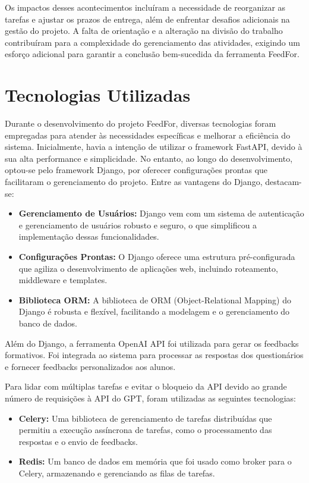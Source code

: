 Os impactos desses acontecimentos incluíram a necessidade de reorganizar as tarefas e ajustar os prazos de entrega, além de enfrentar desafios adicionais na gestão do projeto. A falta de orientação e a alteração na divisão do trabalho contribuíram para a complexidade do gerenciamento das atividades, exigindo um esforço adicional para garantir a conclusão bem-sucedida da ferramenta FeedFor.

\section{Tecnologias Utilizadas}

Durante o desenvolvimento do projeto FeedFor, diversas tecnologias foram empregadas para atender às necessidades específicas e melhorar a eficiência do sistema. Inicialmente, havia a intenção de utilizar o framework FastAPI, devido à sua alta performance e simplicidade. No entanto, ao longo do desenvolvimento, optou-se pelo framework Django, por oferecer configurações prontas que facilitaram o gerenciamento do projeto. Entre as vantagens do Django, destacam-se:

\begin{itemize}
    \item \textbf{Gerenciamento de Usuários:} Django vem com um sistema de autenticação e gerenciamento de usuários robusto e seguro, o que simplificou a implementação dessas funcionalidades.
    \item \textbf{Configurações Prontas:} O Django oferece uma estrutura pré-configurada que agiliza o desenvolvimento de aplicações web, incluindo roteamento, middleware e templates.
    \item \textbf{Biblioteca ORM:} A biblioteca de ORM (Object-Relational Mapping) do Django é robusta e flexível, facilitando a modelagem e o gerenciamento do banco de dados.
\end{itemize}

Além do Django, a ferramenta OpenAI API foi utilizada para gerar os feedbacks formativos. Foi integrada ao sistema para processar as respostas dos questionários e fornecer feedbacks personalizados aos alunos.

Para lidar com múltiplas tarefas e evitar o bloqueio da API devido ao grande número de requisições à API do GPT, foram utilizadas as seguintes tecnologias:

\begin{itemize}
    \item \textbf{Celery:} Uma biblioteca de gerenciamento de tarefas distribuídas que permitiu a execução assíncrona de tarefas, como o processamento das respostas e o envio de feedbacks.
    \item \textbf{Redis:} Um banco de dados em memória que foi usado como broker para o Celery, armazenando e gerenciando as filas de tarefas.
\end{itemize}

